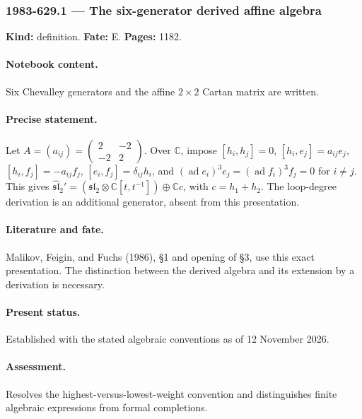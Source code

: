 \subsubsection{1983-629.1 --- The six-generator derived affine algebra}

\label{item:1983-629.1}

\noindent\textbf{Kind:} definition. \textbf{Fate:} E. \textbf{Pages:} 1182.\par

\paragraph{Notebook content.} Six Chevalley generators and the affine \(2\times2\) Cartan matrix are written.

\paragraph{Precise statement.} Let \(A=(a_{ij})=\begin{pmatrix}2&-2\\-2&2\end{pmatrix}\). Over \(\mathbb C\), impose \([h_i,h_j]=0\), \([h_i,e_j]=a_{ij}e_j\), \([h_i,f_j]=-a_{ij}f_j\), \([e_i,f_j]=\delta_{ij}h_i\), and \((\operatorname{ad}e_i)^3e_j=(\operatorname{ad}f_i)^3f_j=0\) for \(i\ne j\). This gives \(\widehat{\mathfrak{sl}}_2'=(\mathfrak{sl}_2\otimes\mathbb C[t,t^{-1}])\oplus\mathbb Cc\), with \(c=h_1+h_2\). The loop-degree derivation is an additional generator, absent from this presentation.

\paragraph{Literature and fate.} Malikov, Feigin, and Fuchs (1986), \S1 and opening of \S3, use this exact presentation. The distinction between the derived algebra and its extension by a derivation is necessary.

\paragraph{Present status.} Established with the stated algebraic conventions as of 12 November 2026.

\paragraph{Assessment.} Resolves the highest-versus-lowest-weight convention and distinguishes finite algebraic expressions from formal completions.

